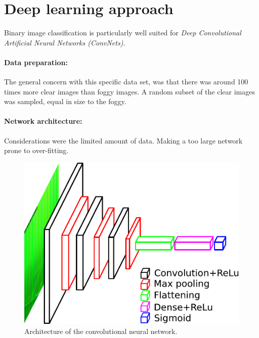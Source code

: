 \documentclass[
    ,title     = {{Methods for image classification}}
    ,longtitle
    ,highlight = dtured
    ,toplogo   = {{template/tex_dtu_compute_b_uk}}
    ,botlogo   = {{template/tex_dtu_frise}}
    ,papersize = {{a0paper}}
    ,colcount  = {{3columns}}
]{dtuposter}
\begin{document}
\begin{minipage}[t]{0.30\textwidth}







\end{minipage}\hfill
\begin{minipage}[t]{0.30\textwidth}

\section*{Deep learning approach}
Binary image classification is particularly well suited for \textit{Deep Convolutional Artificial Neural Networks (ConvNets)}.

\paragraph{Data preparation:} The general concern with this specific data set, was that there was around 100 times more clear images than foggy images. A random subset of the clear images was sampled, equal in size to the foggy.

\paragraph{Network architecture:} Considerations were the limited amount of data. Making a too large network prone to over-fitting.

\begin{figure}
    \centering
    \includegraphics[width=\textwidth]{./Figures/conv_net_fig.pdf}
    \caption{Architecture of the convolutional neural network.}
\end{figure}


\end{minipage}
\end{document}
